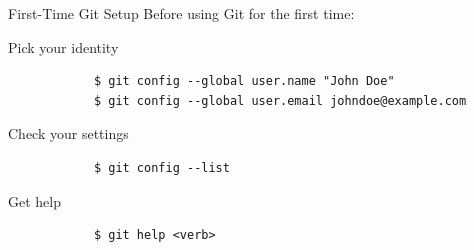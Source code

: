 \documentclass{beamer}
\begin{document}
\begin{frame}[fragile]{First-Time Git Setup}
	Before using Git for the first time:
	\begin{exampleblock}{Pick your identity}
		\begin{verbatim}
			$ git config --global user.name "John Doe"
			$ git config --global user.email johndoe@example.com
		\end{verbatim}
	\end{exampleblock}
	
	\begin{exampleblock}{Check your settings}
		\begin{verbatim}
			$ git config --list
		\end{verbatim}
	\end{exampleblock}
	
	\begin{exampleblock}{Get help}
		\begin{verbatim}
			$ git help <verb>
		\end{verbatim}
	\end{exampleblock}
\end{frame}
\end{document}
